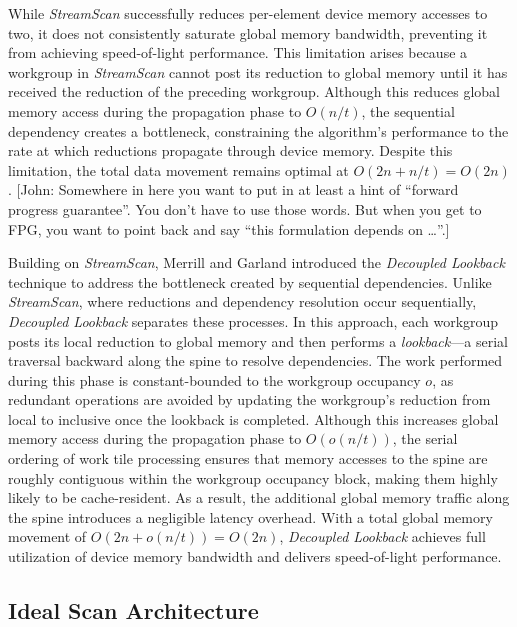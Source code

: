 \documentclass[sigconf]{acmart}
\newcommand{\john}[1]{{\footnotesize\color{cyan}[John: #1]}}
\begin{document}
While \emph{StreamScan} successfully reduces per-element device memory accesses to two, it does not consistently saturate global memory bandwidth, preventing it from achieving speed-of-light performance. This limitation arises because a workgroup in \emph{StreamScan} cannot post its reduction to global memory until it has received the reduction of the preceding workgroup. Although this reduces global memory access during the propagation phase to $O(n/t)$, the sequential dependency creates a bottleneck, constraining the algorithm’s performance to the rate at which reductions propagate through device memory. Despite this limitation, the total data movement remains optimal at $O(2n + n/t) = O(2n)$. \john{Somewhere in here you want to put in at least a hint of ``forward progress guarantee''. You don't have to use those words. But when you get to FPG, you want to point back and say ``this formulation depends on \ldots''.}

Building on \emph{StreamScan}, Merrill and Garland introduced the \emph{Decoupled Lookback} technique to address the bottleneck created by sequential dependencies. Unlike \emph{StreamScan}, where reductions and dependency resolution occur sequentially, \emph{Decoupled Lookback} separates these processes. In this approach, each workgroup posts its local reduction to global memory and then performs a \emph{lookback}—a serial traversal backward along the spine to resolve dependencies. The work performed during this phase is constant-bounded to the workgroup occupancy $o$, as redundant operations are avoided by updating the workgroup's reduction from local to inclusive once the lookback is completed. Although this increases global memory access during the propagation phase to $O(o(n/t))$, the serial ordering of work tile processing ensures that memory accesses to the spine are roughly contiguous within the workgroup occupancy block, making them highly likely to be cache-resident. As a result, the additional global memory traffic along the spine introduces a negligible latency overhead. With a total global memory movement of $O(2n+o(n/t))= O(2n)$, \emph{Decoupled Lookback} achieves full utilization of device memory bandwidth and delivers speed-of-light performance.

\subsection{Ideal Scan Architecture}
\end{document}
